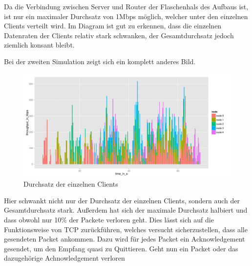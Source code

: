 \documentclass[a4paper, 12pt]{scrartcl}
\begin{document}
Da die Verbindung zwischen Server und Router der Flaschenhals des Aufbaus ist, ist nur ein maximaler Durchsatz von 1Mbps möglich, welcher unter den einzelnen Clients verteilt wird. Im Diagram ist gut zu erkennen, dass die einzelnen Datenraten der Clients relativ stark schwanken, der Gesamtdurchsatz jedoch ziemlich konsant bleibt.



Bei der zweiten Simulation zeigt sich ein komplett anderes Bild. 

\begin{figure}[htbp]
	\centering
    \includegraphics[width=15cm]{ReNe_SoSe_2013_PA2b_943147_stackedbar.pdf}
  \caption{Durchsatz der einzelnen Clients}
  \label{Labelname}
\end{figure}

Hier schwankt nicht nur der Durchsatz der einzelnen Clients, sondern auch der Gesamtdurchsatz stark.
Außerdem hat sich der maximale Durchsatz halbiert und dass obwohl nur 10\% der Packete verloren geht. Dies lässt sich auf die Funktionsweise von TCP zurückführen, welches versucht sicherzustellen, dass alle gesendeten Packet ankommen. Dazu wird für jedes Packet ein Acknowledgement gesendet, um den Empfang quasi zu Quittieren. Geht nun ein Packet oder das dazugehörige Achnowledgement verloren
\end{document}
